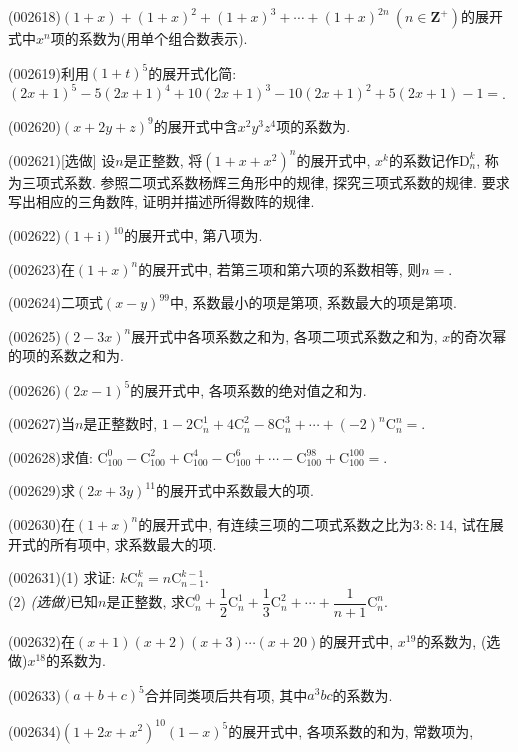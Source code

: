 \item (002618)$(1+x)+(1+x)^2+(1+x)^3+\cdots+(1+x)^{2n} \ (n\in \mathbf{Z}^+)$的展开式中$x^n$项的系数为(用单个组合数表示).
\item (002619)利用$(1+t)^5$的展开式化简: $(2x+1)^5-5(2x+1)^4+10(2x+1)^3-10(2x+1)^2+5(2x+1)-1=$.
\item (002620)$(x+2y+z)^9$的展开式中含$x^2y^3z^4$项的系数为.
\item (002621)[选做]
设$n$是正整数, 将$(1+x+x^2)^n$的展开式中, $x^k$的系数记作$\mathrm{D}_n^k$, 称为三项式系数.
参照二项式系数杨辉三角形中的规律, 探究三项式系数的规律. 要求写出相应的三角数阵, 证明并描述所得数阵的规律.
\item (002622)$(1+\mathrm{i})^{10}$的展开式中, 第八项为.
\item (002623)在$(1+x)^n$的展开式中, 若第三项和第六项的系数相等, 则$n=$.
\item (002624)二项式$(x-y)^{99}$中, 系数最小的项是第项, 系数最大的项是第项.
\item (002625)$(2-3x)^n$展开式中各项系数之和为, 各项二项式系数之和为,
$x$的奇次幂的项的系数之和为.
\item (002626)$(2x-1)^5$的展开式中, 各项系数的绝对值之和为.
\item (002627)当$n$是正整数时, $1-2\mathrm{C}_n^1+4\mathrm{C}_n^2-8\mathrm{C}_n^3+\cdots+(-2)^n\mathrm{C}_n^n=$.
\item (002628)求值: $\mathrm{C}_{100}^{0}-\mathrm{C}_{100}^2+\mathrm{C}_{100}^4-\mathrm{C}_{100}^6+\cdots-\mathrm{C}_{100}^{98}+\mathrm{C}_{100}^{100}=$.
\item (002629)求$(2x+3y)^{11}$的展开式中系数最大的项.
\item (002630)在$(1+x)^n$的展开式中, 有连续三项的二项式系数之比为$3:8:14$, 试在展开式的所有项中, 求系数最大的项.
\item (002631)(1) 求证: $k\mathrm{C}_n^k=n\mathrm{C}_{n-1}^{k-1}$.\\ 
(2) {\it (选做)}已知$n$是正整数, 求$\mathrm{C}_n^0+\dfrac{1}{2}\mathrm{C}_n^1+\dfrac{1}{3}\mathrm{C}_n^2+\cdots+\dfrac{1}{n+1}\mathrm{C}_n^n$.
\item (002632)在$(x+1)(x+2)(x+3)\cdots(x+20)$的展开式中, $x^{19}$的系数为, (选做)$x^{18}$的系数为.
\item (002633)$(a+b+c)^5$合并同类项后共有项, 其中$a^3bc$的系数为.
\item (002634)$(1+2x+x^2)^{10}(1-x)^5$的展开式中, 各项系数的和为, 常数项为,
